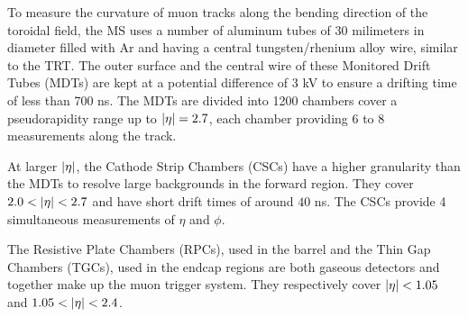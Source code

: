 To measure the curvature of muon tracks along the bending direction of the toroidal field, the MS uses a number of aluminum tubes of 30 milimeters in diameter filled with Ar and having a central tungsten/rhenium alloy wire, similar to the TRT. The outer surface and the central wire of these Monitored Drift Tubes (MDTs) are kept at a potential difference of 3 kV to ensure a drifting time of less than 700 ns. The MDTs are divided into 1200 chambers cover a pseudorapidity range up to $\abs{\eta} =2.7$, each chamber providing 6 to 8 measurements along the track.

At larger $\abs{\eta}$, the Cathode Strip Chambers (CSCs) have a higher granularity than the MDTs to resolve large backgrounds in the forward region. They cover $2.0< \abs{\eta} < 2.7$ and have short drift times of around $40$ ns. The CSCs provide 4 simultaneous measurements of $\eta$ and $\phi$.

The Resistive Plate Chambers (RPCs), used in the barrel and the Thin Gap Chambers (TGCs), used in the endcap regions are both gaseous detectors and together make up the muon trigger system. They respectively cover $\abs{\eta} < 1.05$ and $1.05 < \abs{\eta} < 2.4$.



